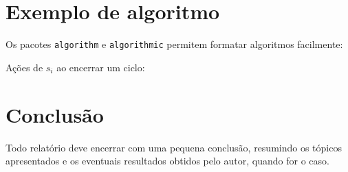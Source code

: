 \documentclass [12pt,oneside] {article}
\begin{document}

\section{Exemplo de algoritmo}

Os pacotes \texttt{algorithm} e \texttt{algorithmic} permitem formatar algoritmos facilmente:

\begin{algorithm}[H]
\caption{Ações de $s_i$ ao encerrar um ciclo:}
\label{on-period-ending}
\begin{small}
\begin{algorithmic}[1]
  \ENDIF
\ENDFOR
\end{algorithmic}
\end{small}
\end{algorithm}
 

\section{Conclusão}

Todo relatório deve encerrar com uma pequena conclusão, resumindo os tópicos apresentados e os eventuais resultados obtidos pelo autor, quando for o caso.




\end{document}
